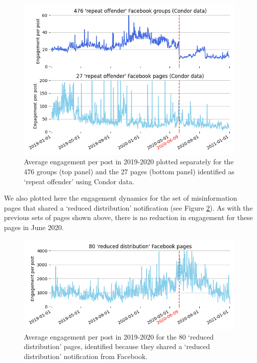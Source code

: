 \documentclass[review]{elsarticle}
\begin{document}
{{\begin{figure}[!h]
\centering
\includegraphics[scale=0.5]{./../figure/supplementary_engagement_groups_and_pages_condor.png}
\caption{
Average engagement per post in 2019-2020 plotted separately for the 476 groups (top panel) and the 27 pages (bottom panel) identified as `repeat offender' using Condor data.
}
\label{engagement_groups_and_pages_condor}
\end{figure}

We also plotted here the engagement dynamics for the set of misinformation pages that shared a `reduced distribution' notification (see Figure \ref{engagement_groups_and_pages_reduce}).
As with the previous sets of pages shown above, there is no reduction in engagement for these pages in June 2020.

\begin{figure}[!h]
\centering
\includegraphics[scale=0.5]{./../figure/supplementary_engagement_pages_reduce.png}
\caption{
Average engagement per post in 2019-2020 for the 80 `reduced distribution' pages, identified because they shared a `reduced distribution' notification from Facebook.
}
\label{engagement_groups_and_pages_reduce}
\end{figure}

}}
\end{document}
